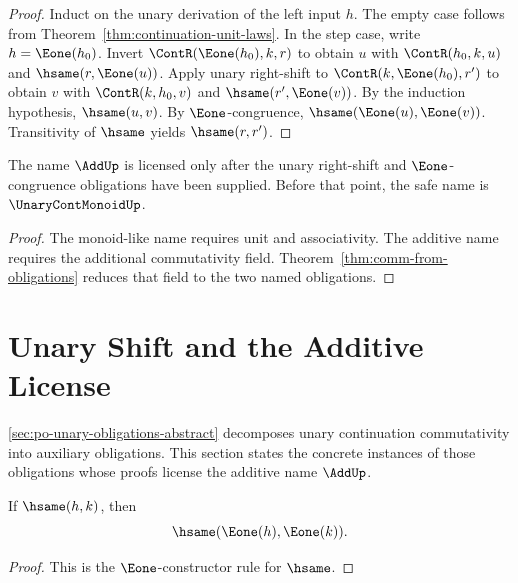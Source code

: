 \begin{proof}
Induct on the unary derivation of the left input \(h\). The empty case follows from Theorem~\ref{thm:continuation-unit-laws}. In the step case, write \(h=\Eone(h_0)\). Invert \(\ContR(\Eone(h_0),k,r)\) to obtain \(u\) with \(\ContR(h_0,k,u)\) and \(\hsame(r,\Eone(u))\). Apply unary right-shift to \(\ContR(k,\Eone(h_0),r')\) to obtain \(v\) with \(\ContR(k,h_0,v)
\) and \(\hsame(r',\Eone(v))\). By the induction hypothesis, \(\hsame(u,v)\). By \(\Eone\)-congruence, \(\hsame(\Eone(u),\Eone(v))\). Transitivity of \(\hsame\) yields \(\hsame(r,r')\).
\end{proof}

\begin{corollary}
\label{cor:additive-naming-boundary}
The name \(\AddUp\) is licensed only after the unary right-shift and \(\Eone\)-congruence obligations have been supplied. Before that point, the safe name is \(\UnaryContMonoidUp\).
\end{corollary}

\begin{proof}
The monoid-like name requires unit and associativity. The additive name requires the additional commutativity field. Theorem~\ref{thm:comm-from-obligations} reduces that field to the two named obligations.
\end{proof}

\section{Unary Shift and the Additive License}
\label{sec:po-unary-shift-instance}

\autoref{sec:po-unary-obligations-abstract} decomposes unary continuation commutativity into auxiliary obligations. This section states the concrete instances of those obligations whose proofs license the additive name \(\AddUp\).

\begin{lemma}
\label{lem:eone-congruence}
If \(\hsame(h,k)\), then
$$
  \hsame(\Eone(h),\Eone(k)).
$$
\end{lemma}

\begin{proof}
This is the \(\Eone\)-constructor rule for \(\hsame\).
\end{proof}


